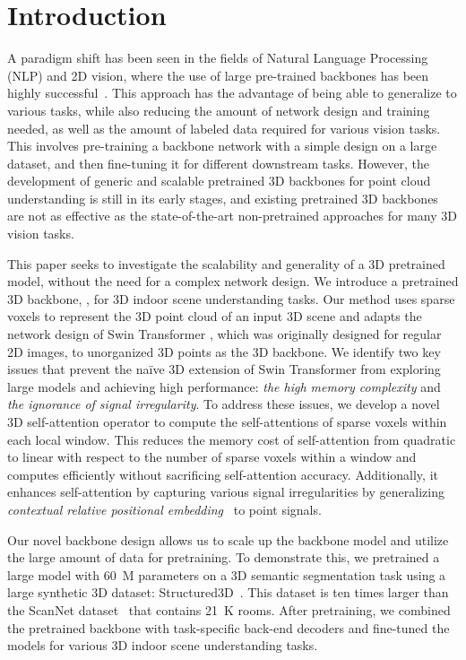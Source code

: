 \documentclass[10pt,twocolumn,letterpaper]{article}
\begin{document}
\section{Introduction}
A paradigm shift has been seen in the fields of Natural Language Processing (NLP) and 2D vision, where the use of large pre-trained backbones has been highly successful~\cite{dosovitskiy2020image,bao2022beit,devlin2018bert,brown2020language,liu2021swin,liu2022swin}. This approach has the advantage of being able to generalize to various tasks, while also reducing the amount of network design and training needed, as well as the amount of labeled data required for various vision tasks. This involves pre-training a backbone network with a simple design on a large dataset, and then fine-tuning it for different downstream tasks. However, the development of generic and scalable pretrained 3D backbones for point cloud understanding is still in its early stages, and existing pretrained 3D backbones are not as effective as the state-of-the-art non-pretrained approaches for many 3D vision tasks.

This paper seeks to investigate the scalability and generality of a 3D pretrained model, without the need for a complex network design. We introduce a pretrained 3D backbone, {\SST}, for 3D indoor scene understanding tasks. Our method uses sparse voxels to represent the 3D point cloud of an input 3D scene and adapts the network design of Swin Transformer \cite{liu2021swin}, which was originally designed for regular 2D images, to unorganized 3D points as the 3D backbone. We identify two key issues that prevent the na\"{i}ve 3D extension of Swin Transformer from exploring large models and achieving high performance: \textit{the high memory complexity} and \textit{the ignorance of signal irregularity}. To address these issues, we develop a novel 3D self-attention operator to compute the self-attentions of sparse voxels within each local window. This reduces the memory cost of self-attention from quadratic to linear with respect to the number of sparse voxels within a window and computes efficiently without sacrificing self-attention accuracy. Additionally, it enhances self-attention by capturing various signal irregularities by generalizing \emph{contextual relative positional embedding}~\cite{wu2021rethinking,lai2022stratified} to point signals.

Our novel {\SST} backbone design allows us to scale up the backbone model and utilize the large amount of data for pretraining. To demonstrate this, we pretrained a large {\SST} model with \SI{60}{M} parameters on a 3D semantic segmentation task using a large synthetic 3D dataset: Structured3D~\cite{zheng2020structured3d}. This dataset is ten times larger than the ScanNet dataset~\cite{dai2017scannet} that contains \SI{21}{K} rooms. After pretraining, we combined the pretrained {\SST} backbone with task-specific back-end decoders and fine-tuned the models for various 3D indoor scene understanding tasks.
\end{document}
